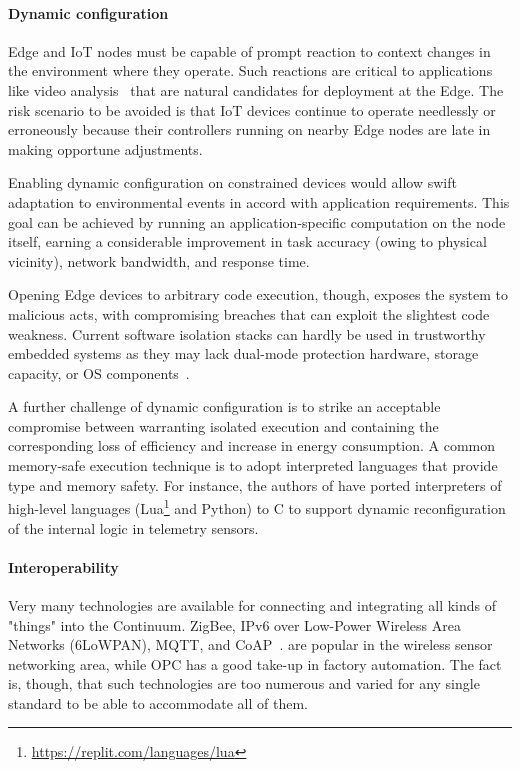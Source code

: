 \paragraph{Dynamic configuration}

Edge and IoT nodes must be capable of prompt reaction to context changes in the environment where they operate. 
Such reactions are critical to applications like video analysis~\cite{jang2018application} that are natural candidates for deployment at the Edge. 
The risk scenario to be avoided is that IoT devices continue to operate needlessly or erroneously because their controllers running on nearby Edge nodes are late in making opportune adjustments.

Enabling dynamic configuration on constrained devices would allow swift adaptation to environmental events in accord with application requirements. 
This goal can be achieved by running an application-specific computation on the node itself, earning a considerable improvement in task accuracy (owing to physical vicinity), network bandwidth, and response time.

Opening Edge devices to arbitrary code execution, though, exposes the system to malicious acts, with compromising breaches that can exploit the slightest code weakness.
Current software isolation stacks can hardly be used in trustworthy embedded systems as they may lack dual-mode protection hardware, storage capacity, or OS components~\cite{peach2020ewasm}. 

A further challenge of dynamic configuration is to strike an acceptable compromise between warranting isolated execution and containing the corresponding loss of efficiency and increase in energy consumption. 
A common memory-safe execution technique is to adopt interpreted languages that provide type and memory safety. 
For instance, the authors of \cite{brzoza2016embedded} have ported interpreters of high-level languages (Lua\footnote{\url{https://replit.com/languages/lua}} and Python) to C to support dynamic reconfiguration of the internal logic in telemetry sensors.

\paragraph{Interoperability}
\label{sec:interoperability}

Very many technologies are available for connecting and integrating all kinds of "things" into the Continuum. 
ZigBee, IPv6 over Low-Power Wireless Area Networks (6LoWPAN), MQTT, and CoAP~\cite{naik2017choice}. are popular in the wireless sensor networking area, while OPC \cite{gruner2016restful} has a good take-up in factory automation. 
The fact is, though, that such technologies are too numerous and varied for any single standard to be able to accommodate all of them.

